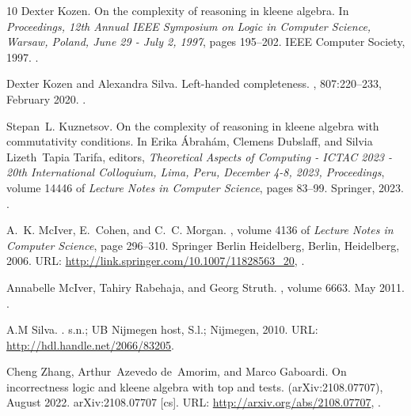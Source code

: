 \documentclass[11pt,a4paper]{amsart}
\theoremstyle{definition}
\begin{document}
\begin{thebibliography}{10}
Dexter Kozen.
\newblock On the complexity of reasoning in kleene algebra.
\newblock In {\em Proceedings, 12th Annual {IEEE} Symposium on Logic in Computer Science, Warsaw, Poland, June 29 - July 2, 1997}, pages 195--202. {IEEE} Computer Society, 1997.
\newblock \href {https://doi.org/10.1109/LICS.1997.614947} {}.

Dexter Kozen and Alexandra Silva.
\newblock Left-handed completeness.
, 807:220--233, February 2020.
\newblock \href {https://doi.org/10.1016/j.tcs.2019.10.040} {}.

Stepan~L. Kuznetsov.
\newblock On the complexity of reasoning in kleene algebra with commutativity conditions.
\newblock In Erika {\'{A}}brah{\'{a}}m, Clemens Dubslaff, and Silvia Lizeth~Tapia Tarifa, editors, {\em Theoretical Aspects of Computing - {ICTAC} 2023 - 20th International Colloquium, Lima, Peru, December 4-8, 2023, Proceedings}, volume 14446 of {\em Lecture Notes in Computer Science}, pages 83--99. Springer, 2023.
\newblock \href {https://doi.org/10.1007/978-3-031-47963-2\_7} {}.

A.~K. McIver, E.~Cohen, and C.~C. Morgan.
, volume 4136 of {\em Lecture Notes in Computer Science}, page 296–310.
\newblock Springer Berlin Heidelberg, Berlin, Heidelberg, 2006.
\newblock URL: \url{http://link.springer.com/10.1007/11828563_20}, \href {https://doi.org/10.1007/11828563_20} {}.

Annabelle McIver, Tahiry Rabehaja, and Georg Struth.
, volume 6663.
\newblock May 2011.
\newblock \href {https://doi.org/10.1007/978-3-642-21070-9_20} {}.

A.M Silva.
.
\newblock s.n.; UB Nijmegen host, S.l.; Nijmegen, 2010.
\newblock URL: \url{http://hdl.handle.net/2066/83205}.

Cheng Zhang, Arthur~Azevedo de~Amorim, and Marco Gaboardi.
\newblock On incorrectness logic and kleene algebra with top and tests.
\newblock (arXiv:2108.07707), August 2022.
\newblock arXiv:2108.07707 [cs].
\newblock URL: \url{http://arxiv.org/abs/2108.07707}, \href {https://doi.org/10.48550/arXiv.2108.07707} {}.

\end{thebibliography}
\end{document}
